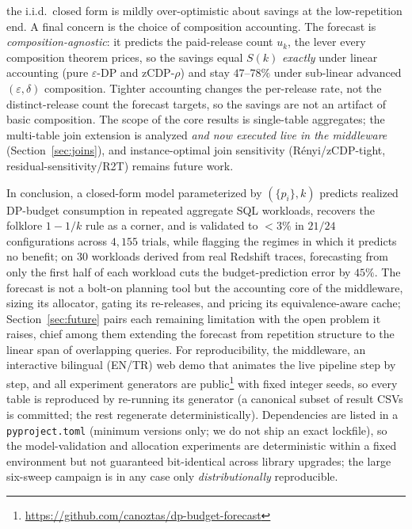 \documentclass[sigconf,nonacm]{acmart}
\newcommand{\eps}{\varepsilon}
\begin{document}
the i.i.d.\ closed form is mildly over-optimistic about savings at the low-repetition end. A final concern is the choice of composition accounting. The forecast is \emph{composition-agnostic}: it predicts the paid-release count $u_k$, the lever every composition theorem prices, so the savings equal $S(k)$ \emph{exactly} under linear accounting (pure $\eps$-DP and zCDP-$\rho$) and stay $47$--$78\%$ under sub-linear advanced $(\eps,\delta)$ composition. Tighter accounting changes the per-release rate, not the distinct-release count the forecast targets, so the savings are not an artifact of basic composition. The scope of the core results is single-table aggregates; the multi-table join extension is analyzed \emph{and now executed live in the middleware} (Section~\ref{sec:joins}), and instance-optimal join sensitivity (Rényi/zCDP-tight, residual-sensitivity/R2T) remains future work.

In conclusion, a closed-form model parameterized by $(\{p_i\},k)$ predicts realized DP-budget consumption in repeated aggregate SQL workloads, recovers the folklore $1-1/k$ rule as a corner, and is validated to $<3\%$ in $21/24$ configurations across $4{,}155$ trials, while flagging the regimes in which it predicts no benefit; on $30$ workloads derived from real Redshift traces, forecasting from only the first half of each workload cuts the budget-prediction error by $45\%$. The forecast is not a bolt-on planning tool but the accounting core of the middleware, sizing its allocator, gating its re-releases, and pricing its equivalence-aware cache; Section~\ref{sec:future} pairs each remaining limitation with the open problem it raises, chief among them extending the forecast from repetition structure to the linear span of overlapping queries. For reproducibility, the middleware, an interactive bilingual (EN/TR) web demo that animates the live pipeline step by step, and all experiment generators are public\footnote{\url{https://github.com/canoztas/dp-budget-forecast}} with fixed integer seeds, so every table is reproduced by re-running its generator (a canonical subset of result CSVs is committed; the rest regenerate deterministically). Dependencies are listed in a \texttt{pyproject.toml} (minimum versions only; we do not ship an exact lockfile), so the model-validation and allocation experiments are deterministic within a fixed environment but not guaranteed bit-identical across library upgrades; the large six-sweep campaign is in any case only \emph{distributionally} reproducible.

\clearpage
\appendix
\end{document}
